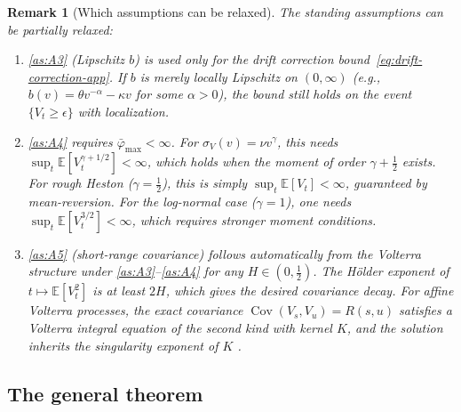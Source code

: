 \documentclass[12pt]{article}
\newtheorem{remark}{Remark}
\theoremstyle{definition}
\DeclareMathOperator{\Cov}{Cov}
\newcommand{\E}{\mathbb{E}}
\begin{document}
\begin{remark}[Which assumptions can be relaxed]
The standing assumptions can be partially relaxed:
\begin{enumerate}[label=(\roman*)]
\item \ref{as:A3} (Lipschitz $b$) is used only for the drift correction
  bound~\eqref{eq:drift-correction-app}. If $b$ is merely locally
  Lipschitz on $(0,\infty)$ (e.g., $b(v) = \theta v^{-\alpha} -
  \kappa v$ for some $\alpha > 0$), the bound still holds on the
  event $\{V_t \ge \epsilon\}$ with localization.
\item \ref{as:A4} requires $\bar\varphi_{\max} < \infty$.
  For $\sigma_V(v) = \nu v^\gamma$, this needs
  $\sup_t \E[V_t^{\gamma+1/2}] < \infty$, which holds when the
  moment of order $\gamma + \tfrac12$ exists.
  For rough Heston ($\gamma = \tfrac12$), this is simply
  $\sup_t \E[V_t] < \infty$, guaranteed by mean-reversion.
  For the log-normal case ($\gamma = 1$), one needs
  $\sup_t \E[V_t^{3/2}] < \infty$, which requires stronger moment
  conditions.
\item \ref{as:A5} (short-range covariance) follows automatically from
  the Volterra structure under \ref{as:A3}--\ref{as:A4} for any
  $H \in (0,\tfrac12)$. The H\"older exponent of $t \mapsto \E[V_t^2]$
  is at least $2H$, which gives the desired covariance decay.
  For affine Volterra processes, the exact covariance
  $\Cov(V_s, V_u) = R(s,u)$ satisfies a Volterra integral equation
  of the second kind with kernel $K$, and the solution inherits the
  singularity exponent of $K$
  \citep[Proposition~3.1]{ElEuchRosenbaum2019}.
\end{enumerate}
\end{remark}

\subsection{The general theorem}
\end{document}
